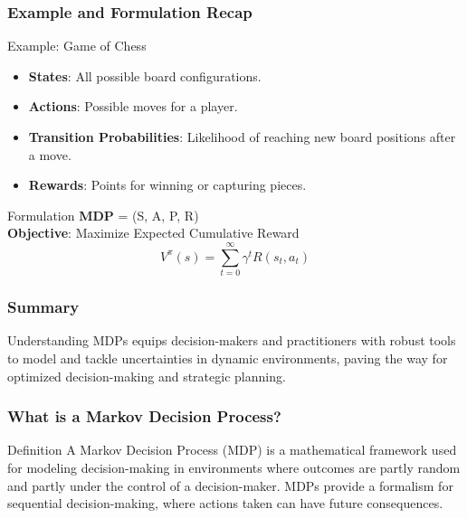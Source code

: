 \documentclass[aspectratio=169]{beamer}
\begin{document}
\begin{frame}[fragile]
    \frametitle{Example and Formulation Recap}
    \begin{block}{Example: Game of Chess}
        \begin{itemize}
            \item \textbf{States}: All possible board configurations.
            \item \textbf{Actions}: Possible moves for a player.
            \item \textbf{Transition Probabilities}: Likelihood of reaching new board positions after a move.
            \item \textbf{Rewards}: Points for winning or capturing pieces.
        \end{itemize}
    \end{block}

    \begin{block}{Formulation}
        \textbf{MDP} = (S, A, P, R) \\
        \textbf{Objective}: Maximize Expected Cumulative Reward
        \begin{equation}
            V^\pi(s) = \sum_{t=0}^{\infty} \gamma^t R(s_t, a_t)
        \end{equation}
    \end{block}
\end{frame}

\begin{frame}[fragile]
    \frametitle{Summary}
    Understanding MDPs equips decision-makers and practitioners with robust tools to model and tackle uncertainties in dynamic environments, paving the way for optimized decision-making and strategic planning.
\end{frame}

\begin{frame}[fragile]
    \frametitle{What is a Markov Decision Process?}
    \begin{block}{Definition}
        A Markov Decision Process (MDP) is a mathematical framework used for modeling decision-making in environments where outcomes are partly random and partly under the control of a decision-maker. MDPs provide a formalism for sequential decision-making, where actions taken can have future consequences.
    \end{block}
\end{frame}
\end{document}
